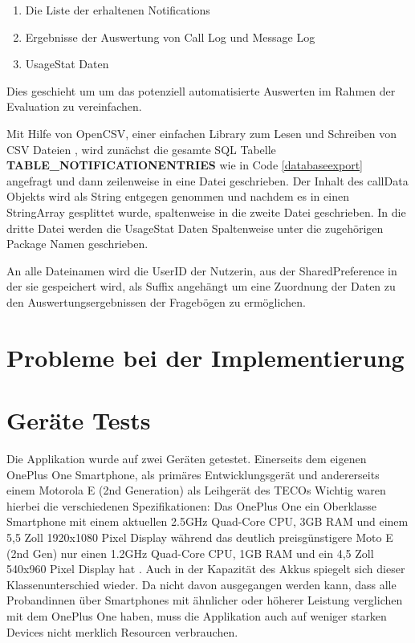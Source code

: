 \begin{enumerate}
  \item Die Liste der erhaltenen Notifications
  \item Ergebnisse der Auswertung von Call Log und Message Log
  \item UsageStat Daten
\end{enumerate}

Dies geschieht um um das potenziell automatisierte Auswerten im Rahmen der Evaluation zu vereinfachen.
\par

Mit Hilfe von OpenCSV, einer einfachen Library zum Lesen und Schreiben von CSV Dateien \cite{opencsv},
wird zunächst die gesamte SQL Tabelle \textbf{TABLE\_NOTIFICATIONENTRIES} wie in Code \ref{databaseexport} angefragt und dann zeilenweise in eine Datei geschrieben.
Der Inhalt des callData Objekts wird als String entgegen genommen und nachdem es in einen StringArray gesplittet wurde, spaltenweise in die zweite Datei geschrieben.
In die dritte Datei werden die UsageStat Daten Spaltenweise unter die zugehörigen Package Namen geschrieben.
\par
An alle Dateinamen wird die UserID der Nutzerin, aus der SharedPreference in der sie gespeichert wird, als Suffix angehängt um eine Zuordnung der Daten zu den Auswertungsergebnissen der Fragebögen zu ermöglichen.

\section{Probleme bei der Implementierung}

\section{Geräte Tests}

Die Applikation wurde auf zwei Geräten getestet.
Einerseits dem eigenen OnePlus One Smartphone, als primäres Entwicklungsgerät und andererseits einem Motorola E (2nd Generation) als Leihgerät des TECOs
Wichtig waren hierbei die verschiedenen Spezifikationen:
Das OnePlus One ein Oberklasse Smartphone mit einem aktuellen 2.5GHz Quad-Core CPU, 3GB RAM und einem 5,5 Zoll 1920x1080 Pixel Display \cite{oneplusone}
während das deutlich preisgünstigere Moto E (2nd Gen) nur einen 1.2GHz Quad-Core CPU, 1GB RAM und ein 4,5 Zoll 540x960 Pixel Display hat \cite{motoe}.
Auch in der Kapazität des Akkus spiegelt sich dieser Klassenunterschied wieder.
Da nicht davon ausgegangen werden kann, dass alle Probandinnen über Smartphones mit ähnlicher oder höherer Leistung verglichen mit dem OnePlus One haben, muss die Applikation auch auf weniger starken
Devices nicht merklich Resourcen verbrauchen.
 

